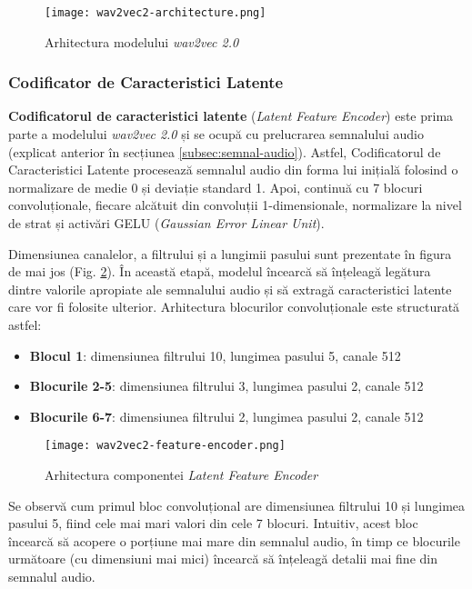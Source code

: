 \begin{figure}[h]
    \centering
    \texttt{[image: wav2vec2-architecture.png]}
    \caption{Arhitectura modelului \textit{wav2vec 2.0} \protect\footnotemark[2]}
    \label{fig:wav2vec2-architecture}
\end{figure}

\subsubsection{Codificator de Caracteristici Latente}
\textbf{Codificatorul de caracteristici latente} (\textit{Latent Feature Encoder}) este prima parte a modelului
\textit{wav2vec 2.0} și se ocupă cu prelucrarea semnalului audio (explicat anterior în secțiunea \ref{subsec:semnal-audio}).
Astfel, Codificatorul de Caracteristici Latente procesează semnalul audio din forma lui inițială folosind o 
normalizare de medie 0 și deviație standard 1. Apoi, continuă cu 7 blocuri convoluționale, fiecare alcătuit
din convoluții 1-dimensionale, normalizare la nivel de strat și activări GELU (\textit{Gaussian Error Linear Unit}).
\par
Dimensiunea canalelor, a filtrului și a lungimii pasului sunt prezentate în figura de mai jos
(Fig. \ref{fig:latent-feature-encoder}). În această etapă, modelul încearcă să înțeleagă legătura dintre
valorile apropiate ale semnalului audio și să extragă caracteristici latente care vor fi folosite ulterior. Arhitectura
blocurilor convoluționale este structurată astfel:
\begin{itemize}
    \item \textbf{Blocul 1}: dimensiunea filtrului 10, lungimea pasului 5, canale 512
    \item \textbf{Blocurile 2-5}: dimensiunea filtrului 3, lungimea pasului 2, canale 512
    \item \textbf{Blocurile 6-7}: dimensiunea filtrului 2, lungimea pasului 2, canale 512
\end{itemize}


\vspace{-0.5em}
\begin{figure}[h]
    \centering
    \texttt{[image: wav2vec2-feature-encoder.png]}
    \caption{Arhitectura componentei \textit{Latent Feature Encoder} \protect\footnotemark[1]}
    \label{fig:latent-feature-encoder}
\end{figure}
\vspace{-0.5em}
\par
Se observă cum primul bloc convoluțional are dimensiunea filtrului 10 și lungimea pasului 5,
fiind cele mai mari valori din cele 7 blocuri. Intuitiv, acest bloc încearcă să acopere o porțiune
mai mare din semnalul audio, în timp ce blocurile următoare (cu dimensiuni mai mici) încearcă să
înțeleagă detalii mai fine din semnalul audio.


